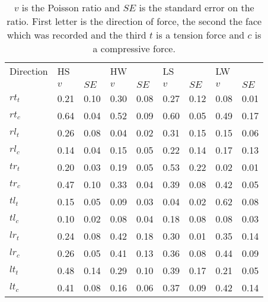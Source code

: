 \documentclass[10pt]{article}
\begin{document}
\begin{table}
\caption[Poisson ratios]{\(v\) is the Poisson ratio and \(SE\) is the standard error on the ratio. First letter is the direction of force, the second the face which was recorded and the third \(t\) is a tension force and \(c\) is a compressive force.}
\label{table:poisson ratios}
\begin{tabular}{lllllllll}
\hline
Direction& HS&& HW&& LS&&LW&\\
 & \(v\)&\(SE\)& \(v\)&\(SE\)& \(v\)&\(SE\)& \(v\)&\(SE\)\\
\hline
\(rt_t\) & 0.21 & 0.10 & 0.30 & 0.08& 0.27 & 0.12& 0.08 & 0.01\\
\(rt_c\) & 0.64 & 0.04 & 0.52 & 0.09& 0.60 & 0.05& 0.49 & 0.17\\
\(rl_t\) & 0.26 & 0.08& 0.04 & 0.02& 0.31 & 0.15& 0.15 & 0.06 \\
\(rl_c\) & 0.14 & 0.04& 0.15 & 0.05& 0.22 & 0.14& 0.17 & 0.13 \\
\(tr_t\) & 0.20 & 0.03 & 0.19 & 0.05& 0.53 & 0.22& 0.02 & 0.01\\
\(tr_c\) & 0.47 & 0.10 & 0.33 & 0.04& 0.39 & 0.08& 0.42 & 0.05\\
\(tl_t\) & 0.15 & 0.05 & 0.09 & 0.03& 0.04 & 0.02& 0.62 & 0.08\\
\(tl_c\) & 0.10 & 0.02 & 0.08 & 0.04& 0.18 & 0.08& 0.08 & 0.03\\
\(lr_t\) & 0.24 & 0.08& 0.42& 0.18& 0.30 & 0.01& 0.35 & 0.14 \\
\(lr_c\) & 0.26 & 0.05& 0.41 & 0.13& 0.36 & 0.08& 0.44 & 0.09 \\
\(lt_t\) & 0.48 & 0.14& 0.29 & 0.10& 0.39 & 0.17& 0.21 & 0.05 \\
\(lt_c\) & 0.41 & 0.08& 0.16 & 0.06& 0.37 & 0.09& 0.42 & 0.14 \\
\hline
\end{tabular}
\end{table}
\end{document}
